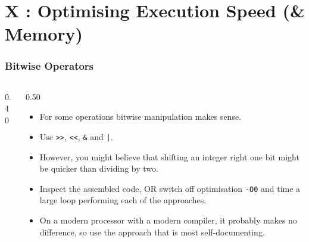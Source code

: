 \section{X : Optimising Execution Speed (\& Memory)}
\label{chap:optim}


\begin{frame}[fragile]
\frametitle{Bitwise Operators}
\begin{columns}[T]

\begin{column}{0.40\textwidth}

\end{column}

\pause
\begin{column}{0.50\textwidth}
\begin{itemize}[<+->]
\item For some operations bitwise manipulation makes
sense.
\item Use \verb^>>^, \verb^<<^, \verb^&^ and \verb^|^.
\item However, you might believe that shifting an integer right one bit
might be quicker than dividing by two.
\item Inspect the assembled code, OR switch off optimisation \verb^-O0^ and time a large
loop performing each of the approaches.
\item On a modern processor with a modern compiler, it probably makes
no difference, so use the approach that is most self-documenting.
\end{itemize}
\end{column}

\end{columns}
\end{frame}


